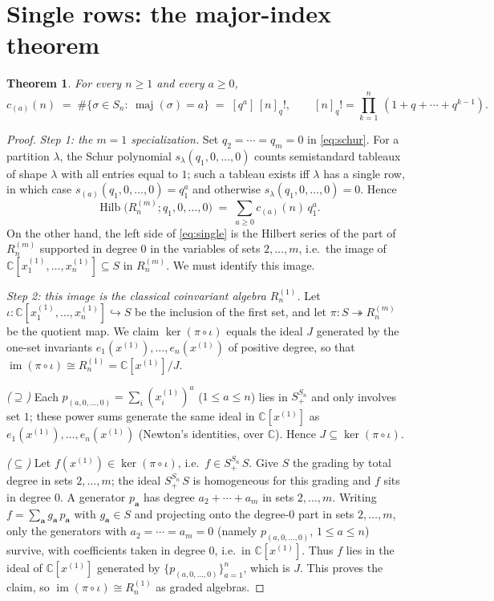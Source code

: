 \documentclass[11pt]{article}
\newtheorem{theorem}{Theorem}
\theoremstyle{definition}
\theoremstyle{remark}
\newcommand{\maj}{\operatorname{maj}}
\newcommand{\Hilb}{\operatorname{Hilb}}
\newcommand{\CC}{\mathbb{C}}
\newcommand{\bs}{\boldsymbol}
\begin{document}
\section{Single rows: the major-index theorem}

\begin{theorem}\label{thm:rows}
For every $n\ge 1$ and every $a\ge 0$,
\[
c_{(a)}(n)\;=\;\#\{\sigma\in S_n:\ \maj(\sigma)=a\}\;=\;[q^a]\,[n]_q!,
\qquad [n]_q!=\prod_{k=1}^{n}\,(1+q+\cdots+q^{k-1}).
\]
\end{theorem}

\begin{proof}
\emph{Step 1: the $m=1$ specialization.}
Set $q_2=\cdots=q_m=0$ in \eqref{eq:schur}.  For a partition $\lambda$, the Schur
polynomial $s_\lambda(q_1,0,\dots,0)$ counts semistandard tableaux of shape $\lambda$ with
all entries equal to $1$; such a tableau exists iff $\lambda$ has a single row, in which case
$s_{(a)}(q_1,0,\dots,0)=q_1^{a}$ and otherwise $s_\lambda(q_1,0,\dots,0)=0$.  Hence
\begin{equation}\label{eq:single}
\Hilb\bigl(R_n^{(m)};q_1,0,\dots,0\bigr)\;=\;\sum_{a\ge 0}c_{(a)}(n)\,q_1^{a}.
\end{equation}
On the other hand, the left side of \eqref{eq:single} is the Hilbert series of the part of
$R_n^{(m)}$ supported in degree $0$ in the variables of sets $2,\dots,m$, i.e.\ the image of
$\CC[x_1^{(1)},\dots,x_n^{(1)}]\subseteq S$ in $R_n^{(m)}$.  We must identify this image.

\emph{Step 2: this image is the classical coinvariant algebra $R_n^{(1)}$.}
Let $\iota:\CC[x_1^{(1)},\dots,x_n^{(1)}]\hookrightarrow S$ be the inclusion of the first
set, and let $\pi:S\twoheadrightarrow R_n^{(m)}$ be the quotient map.  We claim
$\ker(\pi\circ\iota)$ equals the ideal $J$ generated by the one-set invariants
$e_1(x^{(1)}),\dots,e_n(x^{(1)})$ of positive degree, so that
$\operatorname{im}(\pi\circ\iota)\cong R_n^{(1)}=\CC[x^{(1)}]/J$.

\emph{($\supseteq$)}  Each $p_{(a,0,\dots,0)}=\sum_i (x_i^{(1)})^{a}$ ($1\le a\le n$) lies in
$S^{S_n}_+$ and only involves set $1$; these power sums generate the same ideal in
$\CC[x^{(1)}]$ as $e_1(x^{(1)}),\dots,e_n(x^{(1)})$ (Newton's identities, over $\CC$).
Hence $J\subseteq\ker(\pi\circ\iota)$.

\emph{($\subseteq$)}  Let $f(x^{(1)})\in\ker(\pi\circ\iota)$, i.e.\ $f\in S^{S_n}_+\,S$.  Give
$S$ the grading by total degree in sets $2,\dots,m$; the ideal $S^{S_n}_+\,S$ is homogeneous
for this grading and $f$ sits in degree $0$.  A generator $p_{\bs a}$ has degree
$a_2+\cdots+a_m$ in sets $2,\dots,m$.  Writing $f=\sum_{\bs a} g_{\bs a}\,p_{\bs a}$ with
$g_{\bs a}\in S$ and projecting onto the degree-$0$ part in sets $2,\dots,m$, only the
generators with $a_2=\cdots=a_m=0$ (namely $p_{(a,0,\dots,0)}$, $1\le a\le n$) survive, with
coefficients taken in degree $0$, i.e.\ in $\CC[x^{(1)}]$.  Thus $f$ lies in the ideal of
$\CC[x^{(1)}]$ generated by $\{p_{(a,0,\dots,0)}\}_{a=1}^{n}$, which is $J$.  This proves the
claim, so $\operatorname{im}(\pi\circ\iota)\cong R_n^{(1)}$ as graded algebras.


\end{proof}
\end{document}
